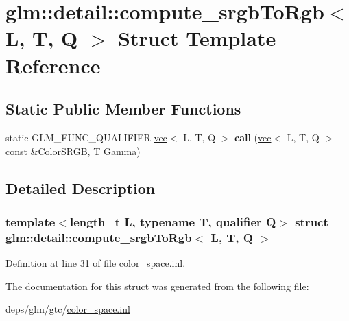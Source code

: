 \hypertarget{structglm_1_1detail_1_1compute__srgbToRgb}{}\section{glm\+:\+:detail\+:\+:compute\+\_\+srgb\+To\+Rgb$<$ L, T, Q $>$ Struct Template Reference}
\label{structglm_1_1detail_1_1compute__srgbToRgb}
\subsection*{Static Public Member Functions}
\begin{DoxyCompactItemize}
\item 
\mbox{\label{structglm_1_1detail_1_1compute__srgbToRgb_ab3c2c31d63a2548991596b8e460c4db7}} 
static G\+L\+M\+\_\+\+F\+U\+N\+C\+\_\+\+Q\+U\+A\+L\+I\+F\+I\+ER \hyperlink{structglm_1_1vec}{vec}$<$ L, T, Q $>$ {\bfseries call} (\hyperlink{structglm_1_1vec}{vec}$<$ L, T, Q $>$ const \&Color\+S\+R\+GB, T Gamma)
\end{DoxyCompactItemize}


\subsection{Detailed Description}
\subsubsection*{template$<$length\+\_\+t L, typename T, qualifier Q$>$\newline
struct glm\+::detail\+::compute\+\_\+srgb\+To\+Rgb$<$ L, T, Q $>$}



Definition at line 31 of file color\+\_\+space.\+inl.



The documentation for this struct was generated from the following file\+:\begin{DoxyCompactItemize}
\item 
deps/glm/gtc/\hyperlink{gtc_2color__space_8inl}{color\+\_\+space.\+inl}\end{DoxyCompactItemize}
